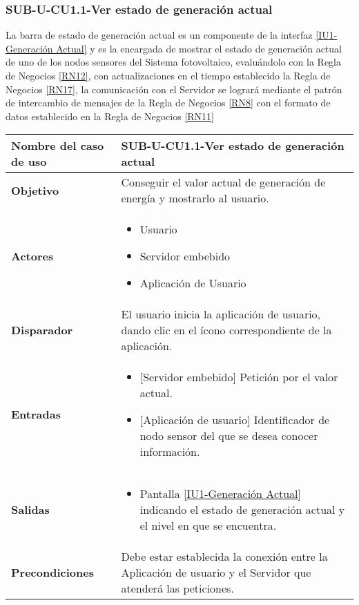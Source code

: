 \subsubsection{SUB-U-CU1.1-Ver estado de generación actual}\label{SUB-U-CU1.1}
La barra de estado de generación actual es un componente de la interfaz \hyperref[fig:monitoreo]{[IU1-Generación Actual]} y es la encargada de mostrar el estado de generación actual de uno de los nodos sensores del Sistema fotovoltaico, evaluándolo con la Regla de Negocios \ref{RN12}, con actualizaciones en el tiempo establecido la Regla de Negocios \ref{RN17}, la comunicación con el Servidor se logrará mediante el patrón de intercambio de mensajes de la Regla de Negocios \ref{RN8} con el formato de datos establecido en la Regla de Negocios \ref{RN11}   
\begin{longtable}{|J{5cm}|J{10.3cm}|}
	\hline
	\textbf{Nombre del caso de uso} &
		SUB-U-CU1.1-Ver estado de generación actual \\ \hline
	\textbf{Objetivo} &
		Conseguir el valor actual de generación de energía y mostrarlo al usuario. \\ \hline
	\textbf{Actores} &
		\begin{itemize}
		    \item Usuario
			\item Servidor embebido
			\item Aplicación de Usuario
		\end{itemize} \\ \hline
	\textbf{Disparador} & 
	    El usuario inicia la aplicación de usuario, dando clic en el ícono correspondiente de la aplicación.\\ \hline 
	\textbf{Entradas} & 
		\begin{itemize}
				\item{[Servidor embebido]} Petición por el valor actual.
				\item{[Aplicación de usuario]} Identificador de nodo sensor del que se desea conocer información.
		\end{itemize}\\ \hline 
	\textbf{Salidas} & 
		\begin{itemize}
			\item Pantalla \hyperref[fig:monitoreo]{[IU1-Generación Actual]} indicando el estado de generación actual y el nivel en que se encuentra.
		\end{itemize} \\ \hline
	\textbf{Precondiciones} &
		Debe estar establecida la conexión entre la Aplicación de usuario y el Servidor que atenderá las peticiones. \\ \hline

\end{longtable}

